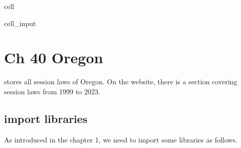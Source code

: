 \documentclass[letterpaper,10pt,english]{jupyterBook}
\begin{document}
\begin{sphinxuseclass}{cell}
\begin{sphinxVerbatimInput}
\begin{sphinxuseclass}{cell_input}
\begin{sphinxVerbatim}[commandchars=\\\{\}]
\end{sphinxVerbatim}

\end{sphinxuseclass}\end{sphinxVerbatimInput}

\end{sphinxuseclass}
\sphinxstepscope


\chapter{Ch 40 Oregon}
\label{\detokenize{ch40:ch-40-oregon}}\label{\detokenize{ch40::doc}}
\sphinxAtStartPar
{} stores all session laws of Oregon. On the website, there is a  section covering session laws from 1999 to 2023.

\sphinxAtStartPar
{}


\section{import libraries}
\label{\detokenize{ch40:import-libraries}}
\sphinxAtStartPar
As introduced in the chapter 1, we need to import some libraries as follows.
\end{document}
